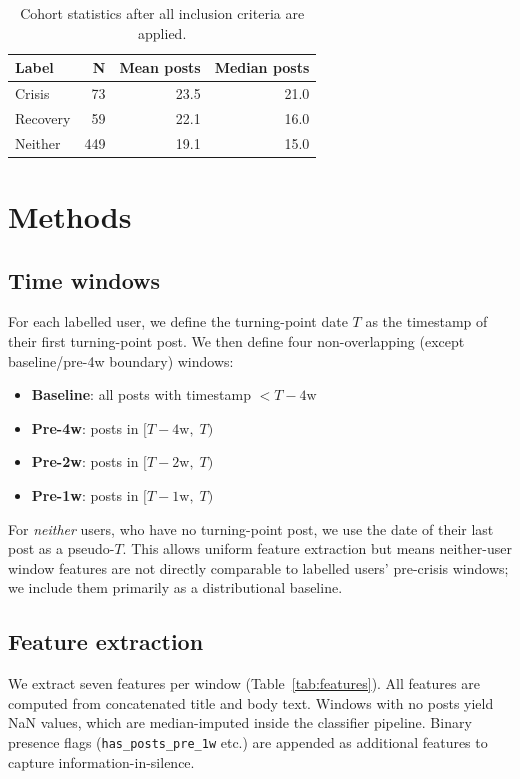 \documentclass[11pt]{article}
\begin{document}
\begin{table}[h]
\small
\centering
\begin{tabular}{lrrr}
\toprule
\textbf{Label} & \textbf{N} & \textbf{Mean posts} & \textbf{Median posts} \\
\midrule
Crisis   & 73  & 23.5 & 21.0 \\
Recovery & 59  & 22.1 & 16.0 \\
Neither  & 449 & 19.1 & 15.0 \\
\bottomrule
\end{tabular}
\caption{Cohort statistics after all inclusion criteria are applied.}
\label{tab:cohort}
\end{table}

\section{Methods}
\label{sec:methods}

\subsection{Time windows}
For each labelled user, we define the turning-point date $T$ as the
timestamp of their first turning-point post.
We then define four non-overlapping (except baseline/pre-4w boundary)
windows:

\begin{itemize}
  \item \textbf{Baseline}: all posts with timestamp $< T - 4\text{w}$
  \item \textbf{Pre-4w}: posts in $[T - 4\text{w},\; T)$
  \item \textbf{Pre-2w}: posts in $[T - 2\text{w},\; T)$
  \item \textbf{Pre-1w}: posts in $[T - 1\text{w},\; T)$
\end{itemize}

For \emph{neither} users, who have no turning-point post, we use the
date of their last post as a pseudo-$T$.
This allows uniform feature extraction but means neither-user window
features are not directly comparable to labelled users' pre-crisis windows;
we include them primarily as a distributional baseline.

\subsection{Feature extraction}
\label{sec:features}
We extract seven features per window (Table~\ref{tab:features}).
All features are computed from concatenated title and body text.
Windows with no posts yield NaN values, which are median-imputed inside
the classifier pipeline.
Binary presence flags (\texttt{has\_posts\_pre\_1w} etc.) are appended
as additional features to capture information-in-silence.
\end{document}
